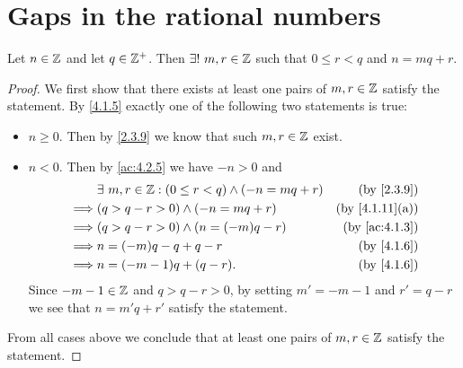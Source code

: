 \section{Gaps in the rational numbers}\label{sec:4.4}

\begin{ac}\label{ac:4.4.1}
  Let \(n \in \mathbb{Z}\) and let \(q \in \mathbb{Z}^+\).
  Then \(\exists!\ m, r \in \mathbb{Z}\) such that \(0 \leq r < q\) and \(n = mq + r\).
\end{ac}

\begin{proof}
  We first show that there exists at least one pairs of \(m, r \in \mathbb{Z}\) satisfy the statement.
  By \cref{4.1.5} exactly one of the following two statements is true:
  \begin{itemize}
    \item \(n \geq 0\).
          Then by \cref{2.3.9} we know that such \(m, r \in \mathbb{Z}\) exist.
    \item \(n < 0\).
          Then by \cref{ac:4.2.5} we have \(-n > 0\) and
          \begin{align*}
                     & \exists\ m, r \in \Z : (0 \leq r < q) \land (-n = mq + r) & \text{(by \cref{2.3.9})}     \\
            \implies & (q > q - r > 0) \land (-n = mq + r)                       & \text{(by \cref{4.1.11}(a))} \\
            \implies & (q > q - r > 0) \land (n = (-m)q - r)                     & \text{(by \cref{ac:4.1.3})}  \\
            \implies & n = (-m)q - q + q - r                                     & \text{(by \cref{4.1.6})}     \\
            \implies & n = (-m - 1)q + (q - r).                                  & \text{(by \cref{4.1.6})}
          \end{align*}
          Since \(-m - 1 \in \mathbb{Z}\) and \(q > q - r > 0\), by setting \(m' = -m - 1\) and \(r' = q - r\) we see that \(n = m'q + r'\) satisfy the statement.
  \end{itemize}
  From all cases above we conclude that at least one pairs of \(m, r \in \mathbb{Z}\) satisfy the statement.


\end{proof}
